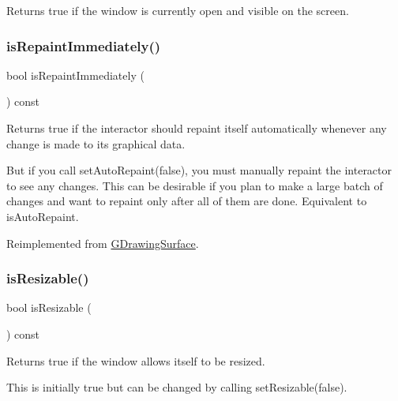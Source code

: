 Returns true if the window is currently open and visible on the screen. 

\mbox{\label{classGWindow_ae88344ee919d3d3de6e38a8381faf209}} 
\subsubsection{\texorpdfstring{is\+Repaint\+Immediately()}{isRepaintImmediately()}}
{\footnotesize\ttfamily bool is\+Repaint\+Immediately (\begin{DoxyParamCaption}{ }\end{DoxyParamCaption}) const\hspace{0.3cm}{\ttfamily [virtual]}}



Returns true if the interactor should repaint itself automatically whenever any change is made to its graphical data. 

But if you call set\+Auto\+Repaint(false), you must manually repaint the interactor to see any changes. This can be desirable if you plan to make a large batch of changes and want to repaint only after all of them are done. Equivalent to is\+Auto\+Repaint. 

Reimplemented from \mbox{\hyperlink{classGDrawingSurface_a82a00267c81cc0ae85ee0feb01a92fa8}{G\+Drawing\+Surface}}.

\mbox{\label{classGWindow_a2afeea3d26d063fa35c104e73275cec7}} 
\subsubsection{\texorpdfstring{is\+Resizable()}{isResizable()}}
{\footnotesize\ttfamily bool is\+Resizable (\begin{DoxyParamCaption}{ }\end{DoxyParamCaption}) const\hspace{0.3cm}{\ttfamily [virtual]}}



Returns true if the window allows itself to be resized. 

This is initially true but can be changed by calling set\+Resizable(false). \mbox{\label{classGWindow_a9d8a6cfb13917785c143e74d40e4e2be}} 
